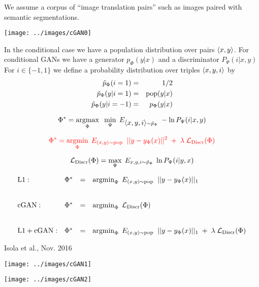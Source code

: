 {We assume a corpus of ``image translation pairs'' such as images paired with semantic segmentations.

\centerline{\texttt{[image: ../images/cGAN0]}}

In the conditional case we have a population distribution over pairs ${\mbox{$\langle x,y\rangle$}}$.
For conditional GANs we have a generator $p_\Phi(y|x)$ and a discriminator $P_\Psi(i|x,y)$
For $i \in \{-1,1\}$ we define a probability distribution over triples
${\mbox{$\langle x,y,i\rangle$}}$ by
\begin{eqnarray*}
\tilde{p}_\Phi(i = 1) & = & 1/2 \\
\tilde{p}_\Phi(y|i=1) & =&  \mathrm{pop}(y|x) \\
\tilde{p}_\Phi(y|i=-1) & = & p_\Phi(y|x)
\end{eqnarray*}

{\color{red} $$\Phi^* = \operatorname*{argmax}_\Phi\;\;\min_\Psi\;E_{{\mbox{$\langle x,y,i\rangle$}} \sim \tilde{p}_\Phi}\;-\ln P_\Psi(i|x,y)$$}


$${\color{red} \Phi^* = \operatorname*{argmin}_\Phi\;E_{(x,y) \sim \mathrm{pop}}\;\; ||y- y_\Phi(x)||^2\; + \; \lambda\; {\cal L}_{\mathrm{Discr}}(\Phi)}$$

\vfill
$${\cal L}_\mathrm{Discr}(\Phi) = \max_\Psi \;E_{x,y,i \sim \tilde{p}_\Phi}\; \ln P_\Psi(i|y,x)$$


{\huge
$$\begin{array}{lrcl}
\mathrm{L1:} & \Phi^* & = & \operatorname*{argmin}_\Phi\;E_{(x,y) \sim \mathrm{pop}}\;\; ||y - y_\Phi(x)||_1 \\
\\
\\
\mathrm{cGAN:} & \Phi^* & = & \operatorname*{argmin}_\Phi\;{\cal L}_{\mathrm{Discr}}(\Phi) \\
\\
\\
\mathrm{L1 + cGAN:} & \Phi^* & = & \operatorname*{argmin}_\Phi\;E_{(x,y) \sim \mathrm{pop}}\;\; ||y - y_\Phi(x)||_1\; +\; \lambda\; {\cal L}_\mathrm{Discr}(\Phi)
\end{array}$$
}


{Isola et al., Nov. 2016}

\centerline{\texttt{[image: ../images/cGAN1]}}


\centerline{\texttt{[image: ../images/cGAN2]}}

}
